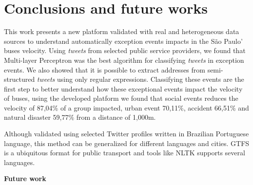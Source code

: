 \documentclass[runningheads]{llncs}
\begin{document}
\section{Conclusions and future works}

This work presents a new platform validated with real and heterogeneous data sources to understand automatically exception events impacts in the São Paulo' buses velocity. Using \textit{tweets} from selected public service providers, we found that Multi-layer Perceptron was the best algorithm for classifying \textit{tweets} in exception events. We also showed that it is possible to extract addresses from semi-structured \textit{tweets} using only regular expressions. Classifying these events are the first step to better understand how these exceptional events impact the velocity of buses, using the developed platform we found that social events reduces the velocity of 87,04\% of a group impacted, urban event 70,11\%, accident 66,51\% and natural disaster 59,77\% from a distance of 1,000m.

Although validated using selected Twitter profiles written in Brazilian Portuguese language, this method can be generalized for different languages and cities. GTFS is a ubiquitous format for public transport and tools like NLTK supports several languages.

\textbf{Future work}





\end{document}
